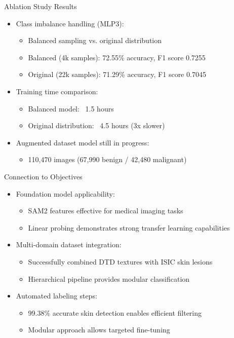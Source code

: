 \documentclass[aspectratio=169]{beamer}
\begin{document}
\begin{frame}{Ablation Study Results}
  \begin{itemize}
    \item Class imbalance handling (MLP3):
      \begin{itemize}
        \item Balanced sampling vs. original distribution
        \item Balanced (4k samples): 72.55\% accuracy, F1 score 0.7255
        \item Original (22k samples): 71.29\% accuracy, F1 score 0.7045
      \end{itemize}
    \item Training time comparison:
      \begin{itemize}
        \item Balanced model: ~1.5 hours
        \item Original distribution: ~4.5 hours (3x slower)
      \end{itemize}
    \item Augmented dataset model still in progress:
      \begin{itemize}
        \item 110,470 images (67,990 benign / 42,480 malignant)
      \end{itemize}
  \end{itemize}
\end{frame}

\begin{frame}{Connection to Objectives}
  \begin{itemize}
    \item Foundation model applicability:
      \begin{itemize}
        \item SAM2 features effective for medical imaging tasks
        \item Linear probing demonstrates strong transfer learning capabilities
      \end{itemize}
    \item Multi-domain dataset integration:
      \begin{itemize}
        \item Successfully combined DTD textures with ISIC skin lesions
        \item Hierarchical pipeline provides modular classification
      \end{itemize}
    \item Automated labeling steps:
      \begin{itemize}
        \item 99.38\% accurate skin detection enables efficient filtering
        \item Modular approach allows targeted fine-tuning
      \end{itemize}
  \end{itemize}
\end{frame}
\end{document}
